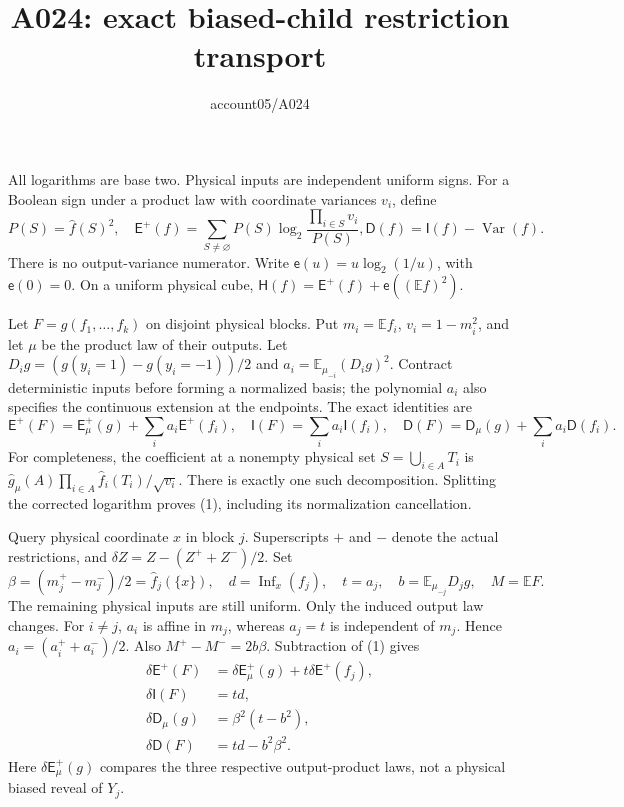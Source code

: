 \documentclass{article}
\newcommand{\HH}{\mathsf H}
\newcommand{\EE}{\mathsf E^+}
\newcommand{\II}{\mathsf I}
\newcommand{\DD}{\mathsf D}
\newcommand{\de}{\delta}
\newcommand{\eb}{\mathsf e}
\begin{document}
\title{A024: exact biased-child restriction transport}
\author{account05/A024}\maketitle
All logarithms are base two. Physical inputs are independent uniform signs.
For a Boolean sign under a product law with coordinate variances $v_i$, define
\[
 P(S)=\widehat f(S)^2,\quad
 \EE(f)=\sum_{S\ne\varnothing}P(S)\log_2\frac{\prod_{i\in S}v_i}{P(S)},
 \DD(f)=\II(f)-\operatorname{Var}(f).
\]
There is no output-variance numerator. Write $\eb(u)=u\log_2(1/u)$,
with $\eb(0)=0$. On a uniform physical cube,
$\HH(f)=\EE(f)+\eb((\mathbb Ef)^2)$.

Let $F=g(f_1,\ldots,f_k)$ on disjoint physical blocks. Put
$m_i=\mathbb Ef_i$, $v_i=1-m_i^2$, and let $\mu$ be the product law
of their outputs. Let $D_i g=(g(y_i=1)-g(y_i=-1))/2$ and
$a_i=\mathbb E_{\mu_{-i}}(D_i g)^2$. Contract deterministic inputs
before forming a normalized basis; the polynomial $a_i$ also specifies
the continuous extension at the endpoints. The exact identities are
\[
 \EE(F)=\EE_\mu(g)+\sum_i a_i\EE(f_i),\quad
 \II(F)=\sum_i a_i\II(f_i),\quad
 \DD(F)=\DD_\mu(g)+\sum_i a_i\DD(f_i).
\tag{1}
\]
For completeness, the coefficient at a nonempty physical set
$S=\bigcup_{i\in A}T_i$ is
$\widehat g_\mu(A)\prod_{i\in A}\widehat f_i(T_i)/\sqrt{v_i}$.
There is exactly one such decomposition. Splitting the corrected
logarithm proves (1), including its normalization cancellation.

Query physical coordinate $x$ in block $j$. Superscripts $+$ and $-$
denote the actual restrictions, and $\de Z=Z-(Z^++Z^-)/2$.
Set
\[
 \beta=(m_j^+-m_j^-)/2=\widehat f_j(\{x\}),\quad
 d=\operatorname{Inf}_x(f_j),\quad
 t=a_j,\quad b=\mathbb E_{\mu_{-j}}D_jg,\quad M=\mathbb EF.
\]
The remaining physical inputs are still uniform. Only the induced output
law changes. For $i\ne j$, $a_i$ is affine in $m_j$, whereas $a_j=t$
is independent of $m_j$. Hence $a_i=(a_i^++a_i^-)/2$. Also
$M^+-M^-=2b\beta$. Subtraction of (1) gives
\begin{align}
 \de\EE(F)&=\de\EE_\mu(g)+t\de\EE(f_j),\\
 \de\II(F)&=td,\\
 \de\DD_\mu(g)&=\beta^2(t-b^2),\\
 \de\DD(F)&=td-b^2\beta^2.
\tag{2}
\end{align}
Here $\de\EE_\mu(g)$ compares the three respective output-product laws,
not a physical biased reveal of $Y_j$.
\end{document}
